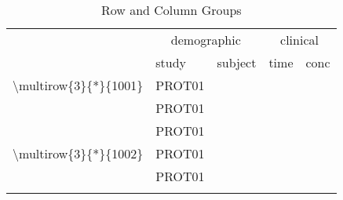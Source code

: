\documentclass[titlepage]{article}
\begin{document}
\begin{Schunk}
\begin{table}[H]
 \caption[Row and Column Groups]{Row and Column Groups }
 \begin{center}
  \begin{tabular}{l|lr|rr}
    \hline \hline
   \multicolumn{1}{c|}{} & \multicolumn{2}{c|}{demographic} & \multicolumn{2}{c}{clinical} \\
     & study & subject & time & conc \\ \hline
   \textbackslash{}multirow\{3\}\{*\}\{1001\} & PROT01 & \verb#1001# & \verb#0# & \verb#0.12# \\
                          & PROT01 & \verb#1001# & \verb#1# & \verb#34.00# \\
                          & PROT01 & \verb#1001# & \verb#2# & \verb#5.60# \\ \hline
   \textbackslash{}multirow\{3\}\{*\}\{1002\} & PROT01 & \verb#1002# & \verb#0# & \verb#0.50# \\
                          & PROT01 & \verb#1002# & \verb#1# & \verb#200.00# \\
                          &  & \verb#1002# & \verb#2# & \verb## \\ \hline
  \end{tabular}
 \end{center}
\end{table}\end{Schunk}
\end{document}
